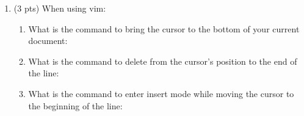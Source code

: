 \documentclass{article}
\begin{document}
\begin{enumerate}
\item
(3 pts)
When using vim:
\begin{enumerate}
\item
What is the command to bring the cursor to the bottom of your current document:
\vspace{0.75in}
\item
What is the command to delete from the cursor's position to the end of the line:
\vspace{0.75in}
\item
What is the command to enter insert mode while moving the cursor to the beginning of the line:
\vspace{0.75in}
\end{enumerate}

\end{enumerate}
\end{document}
